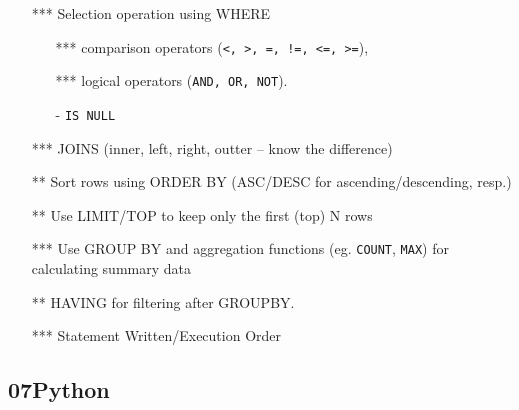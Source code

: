 \documentclass[12pt]{article}%
\begin{document}
\begin{itemize}
\item[***] Selection operation using WHERE
\begin{itemize}
\item[***] comparison operators (\verb|<, >, =, !=, <=, >=|), 
\item[***] logical operators (\verb|AND, OR, NOT|).
\item[-] \verb|IS NULL|
\end{itemize}
\item[***] JOINS (inner, left, right, outter -- know the difference)
\item[**] Sort rows using ORDER BY (ASC/DESC for ascending/descending, resp.)
\item[**] Use LIMIT/TOP to keep only the first (top) N rows
\item[***] Use GROUP BY and aggregation functions (eg. \verb|COUNT|, \verb|MAX|)  for calculating summary data
\item[**] HAVING for filtering after GROUPBY.
\item[***]  Statement Written/Execution Order 
\end{itemize}


\subsection*{07Python}
\end{document}
